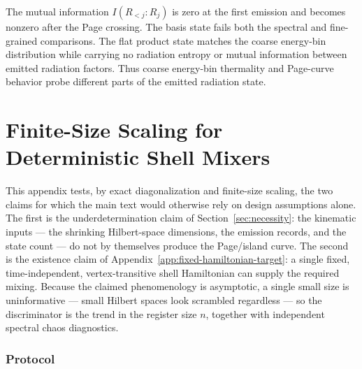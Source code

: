 \documentclass[12pt]{article}
\begin{document}
The mutual information $I(R_{<j}:R_j)$ is zero at the first emission and
becomes nonzero after the Page crossing.  The basis state fails both the
spectral and fine-grained comparisons.  The flat product state matches the
coarse energy-bin distribution while carrying no radiation entropy or mutual
information between emitted radiation factors.  Thus coarse energy-bin
thermality and Page-curve behavior probe different parts of the emitted
radiation state.

\section{Finite-Size Scaling for Deterministic Shell Mixers}
\label{app:cayley-scaling}

This appendix tests, by exact diagonalization and finite-size scaling, the
two claims for which the main text would otherwise rely on design assumptions
alone.  The first is the underdetermination claim of
Section~\ref{sec:necessity}: the kinematic inputs --- the shrinking
Hilbert-space dimensions, the emission records, and the state count --- do
not by themselves produce the Page/island curve.  The second is the existence
claim of Appendix~\ref{app:fixed-hamiltonian-target}: a single fixed,
time-independent, vertex-transitive shell Hamiltonian can supply the required
mixing.  Because the claimed phenomenology is asymptotic, a single small size
is uninformative --- small Hilbert spaces look scrambled regardless --- so
the discriminator is the trend in the register size $n$, together with
independent spectral chaos diagnostics.

\subsubsection*{Protocol}
\end{document}
